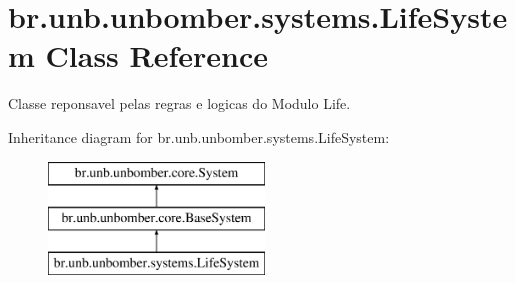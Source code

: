 \hypertarget{classbr_1_1unb_1_1unbomber_1_1systems_1_1_life_system}{\section{br.\+unb.\+unbomber.\+systems.\+Life\+System Class Reference}
\label{classbr_1_1unb_1_1unbomber_1_1systems_1_1_life_system}
}


Classe reponsavel pelas regras e logicas do Modulo Life.  


Inheritance diagram for br.\+unb.\+unbomber.\+systems.\+Life\+System\+:\begin{figure}[H]
\begin{center}
\leavevmode
\includegraphics[height=3.000000cm]{classbr_1_1unb_1_1unbomber_1_1systems_1_1_life_system}
\end{center}
\end{figure}
